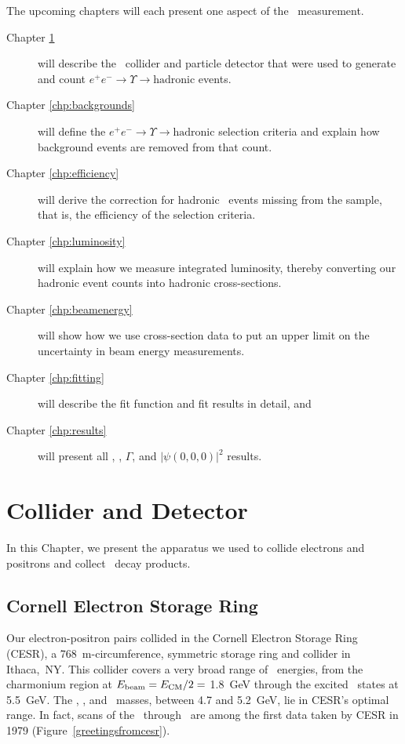 \documentclass{cornell}
\begin{document}
The upcoming chapters will each present one aspect of the \geehadtot\
measurement.
\begin{description}

  \item[Chapter \ref{chp:hardware}] will describe the \ee\ collider
    and particle detector that were used to generate and count $e^+e^-
    \to \Upsilon \to \mbox{hadronic}$ events.

  \item[Chapter \ref{chp:backgrounds}] will define the $e^+e^- \to
    \Upsilon \to \mbox{hadronic}$ selection criteria and explain how
    background events are removed from that count.

  \item[Chapter \ref{chp:efficiency}] will derive the correction
    for hadronic \ups\ events missing from the sample, that is, the
    efficiency of the selection criteria.

  \item[Chapter \ref{chp:luminosity}] will explain how we measure
    integrated luminosity, thereby converting our hadronic event
    counts into hadronic cross-sections.

  \item[Chapter \ref{chp:beamenergy}] will show how we use
    cross-section data to put an upper limit on the uncertainty in
    beam energy measurements.

  \item[Chapter \ref{chp:fitting}] will describe the fit function and
    fit results in detail, and

  \item[Chapter \ref{chp:results}] will present all \geehadtot, \gee,
  $\Gamma$, and $|\psi(0,0,0)|^2$ results.

\end{description}

\chapter{Collider and Detector}
\label{chp:hardware}

In this Chapter, we present the apparatus we used to collide electrons
and positrons and collect \ups\ decay products.

\section{Cornell Electron Storage Ring}

Our electron-positron pairs collided in the Cornell Electron
Storage Ring (CESR), a 768~m-circumference, symmetric storage ring
and collider in Ithaca,~NY.  This collider covers a very
broad range of \ee\ energies, from the charmonium region at
$E_{\mbox{\scriptsize beam}} = E_{\mbox{\scriptsize CM}}/2 =$ 1.8~GeV through the excited \ups\
states at 5.5~GeV.  The \us, \uss, and \usss\ masses, between 4.7 and
5.2~GeV, lie in CESR's optimal range.  In fact, scans of the \us\
through \usss\ are among the first data taken by CESR in 1979
(Figure~\ref{greetingsfromcesr}).
\end{document}
